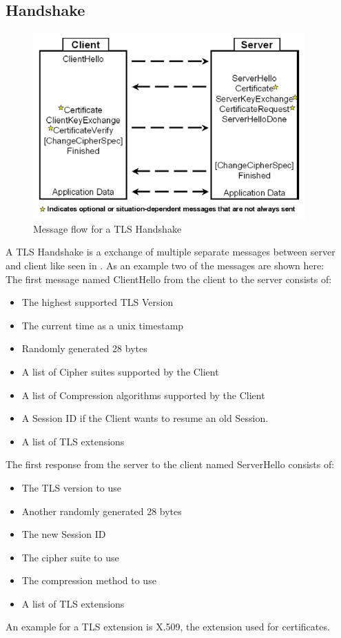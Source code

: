 \documentclass[a4paper,conference]{IEEEtran}
\begin{document}
\subsection{Handshake}
\begin{figure}
  \includegraphics[width=\linewidth]{figures/handshake.png}
  \caption{Message flow for a TLS Handshake\cite{TLSHandshake}}
  \label{fig:handshake}
\end{figure}
A TLS Handshake is a exchange of multiple separate messages between server and client like seen in . As an example two of the messages are shown here:\\
The first message named ClientHello from the client to the server consists of:
\begin{itemize}
    \item The highest supported TLS Version
    \item The current time as a unix timestamp
    \item Randomly generated 28 bytes
    \item A list of Cipher suites supported by the Client
    \item A list of Compression algorithms supported by the Client
    \item A Session ID if the Client wants to resume an old Session.
    \item A list of TLS extensions
\end{itemize}
The first response from the server to the client named ServerHello consists of:
\begin{itemize}
    \item The TLS version to use
    \item Another randomly generated 28 bytes
    \item The new Session ID
    \item The cipher suite to use
    \item The compression method to use
    \item A list of TLS extensions
\end{itemize}
An example for a TLS extension is X.509\cite{rfc7633}, the extension used for certificates.
\end{document}
